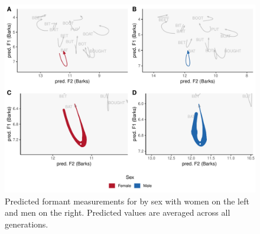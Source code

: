 \begin{figure}[tb!]
	\centering
	\includegraphics[width = 6.5in]{Figures/BAT/BAT_four_panel_plot_summarized.pdf}
	\caption[Predicted formant measurements for \bat by sex.]{Predicted formant measurements for \bat by sex with women on the left and men on the right. Predicted values are averaged across all generations.}
	\label{fig:BAT_four_panel_summarized}
\end{figure}


